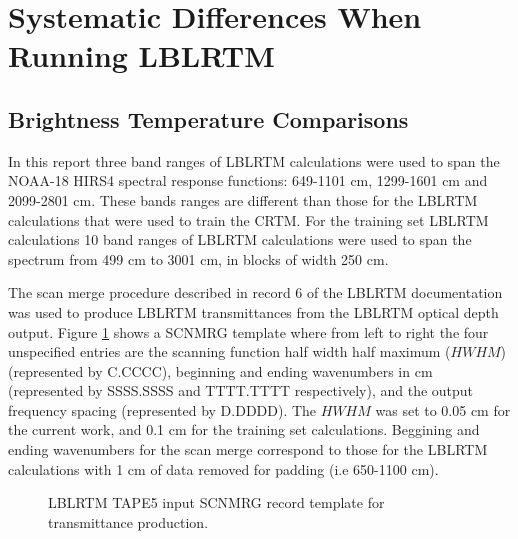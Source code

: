 \section{Systematic Differences When Running LBLRTM}

\subsection{Brightness Temperature Comparisons}

In this report three band ranges of LBLRTM calculations were used to span the NOAA-18 HIRS4 spectral response functions: 649-1101 cm, 1299-1601 cm and 2099-2801 cm. These bands ranges are different than those for the LBLRTM calculations that were used to train the CRTM. 
For the training set LBLRTM calculations 10 band ranges of LBLRTM calculations were used to span the spectrum from 499 cm to 3001 cm, in blocks of width 250 cm.

The scan merge procedure described in record 6 of the LBLRTM documentation was used to produce LBLRTM 
transmittances from the LBLRTM optical depth output. Figure \ref{fig:Scan_Merge} shows a SCNMRG template where from left to right the four unspecified entries are the scanning function half width half maximum ($HWHM$) (represented by C.CCCC), beginning and ending wavenumbers in cm (represented by SSSS.SSSS and TTTT.TTTT respectively), and the output frequency spacing (represented by D.DDDD). The $HWHM$ was set to 0.05 cm for the current work, and 0.1 cm for the training set calculations. Beggining and ending wavenumbers for the scan merge correspond to those for the LBLRTM calculations with 1 cm of data removed for padding (i.e 650-1100 cm). 

\begin{figure}[htp]
  \centering{}
  \caption{LBLRTM TAPE5 input SCNMRG record template for transmittance production.}
  \label{fig:Scan_Merge}
\end{figure}
  

